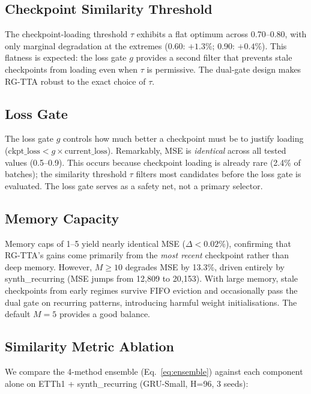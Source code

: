 \documentclass[journal]{IEEEtran}
\begin{document}
\subsection{Checkpoint Similarity Threshold}

The checkpoint-loading threshold $\tau$ exhibits a flat optimum across 0.70--0.80, with only marginal degradation at the extremes (0.60: $+1.3\%$; 0.90: $+0.4\%$). This flatness is expected: the loss gate $g$ provides a second filter that prevents stale checkpoints from loading even when $\tau$ is permissive. The dual-gate design makes RG-TTA robust to the exact choice of $\tau$.

\subsection{Loss Gate}

The loss gate $g$ controls how much better a checkpoint must be to justify loading ($\text{ckpt\_loss} < g \times \text{current\_loss}$). Remarkably, MSE is \emph{identical} across all tested values (0.5--0.9). This occurs because checkpoint loading is already rare (2.4\% of batches); the similarity threshold $\tau$ filters most candidates before the loss gate is evaluated. The loss gate serves as a safety net, not a primary selector.

\subsection{Memory Capacity}

Memory caps of 1--5 yield nearly identical MSE ($\Delta < 0.02\%$), confirming that RG-TTA's gains come primarily from the \emph{most recent} checkpoint rather than deep memory. However, $M \geq 10$ degrades MSE by 13.3\%, driven entirely by synth\_recurring (MSE jumps from 12{,}809 to 20{,}153). With large memory, stale checkpoints from early regimes survive FIFO eviction and occasionally pass the dual gate on recurring patterns, introducing harmful weight initialisations. The default $M = 5$ provides a good balance.

\subsection{Similarity Metric Ablation}
\label{sec:sim_metric_ablation}

We compare the 4-method ensemble (Eq.~\ref{eq:ensemble}) against each component alone on ETTh1 + synth\_recurring (GRU-Small, H=96, 3 seeds):
\end{document}
